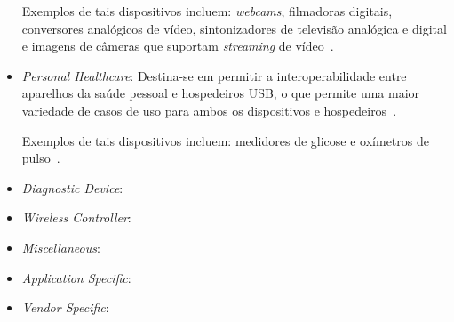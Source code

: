\begin{itemize}
	Exemplos de tais dispositivos incluem: \emph{webcams}, filmadoras digitais, conversores analógicos de vídeo, sintonizadores de televisão analógica e digital e imagens de câmeras que suportam \emph{streaming} de vídeo~\cite{usbvideoclass}.
	\item \emph{Personal Healthcare}: Destina-se em permitir a interoperabilidade entre aparelhos da saúde pessoal e hospedeiros USB, o que permite uma maior variedade de casos de uso para ambos os dispositivos e hospedeiros~\cite{usbhealthcareclass}.

	Exemplos de tais dispositivos incluem: medidores de glicose e oxímetros de pulso~\cite{usbhealthcareclass}.
	\item \emph{Diagnostic Device}: 
	\item \emph{Wireless Controller}: 
	\item \emph{Miscellaneous}: 
	\item \emph{Application Specific}: 
	\item \emph{Vendor Specific}: 
\end{itemize}

